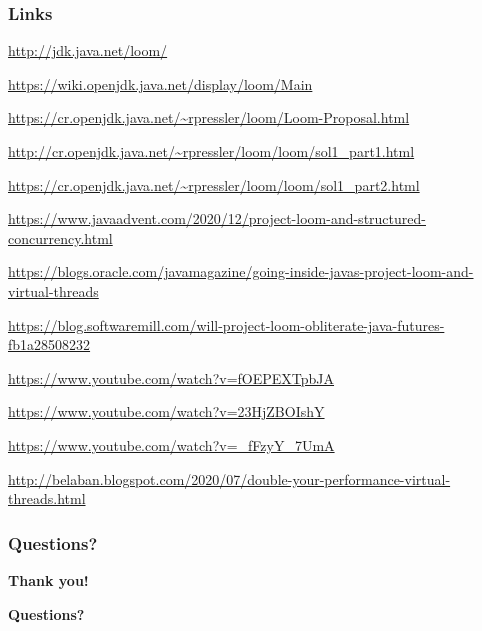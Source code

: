 \documentclass[10pt,utf8]{beamer}
\begin{document}

\begin{frame}
    \frametitle{Links}
    \begin{itemize}
    {\scriptsize
        \item \url{http://jdk.java.net/loom/}
        \item \url{https://wiki.openjdk.java.net/display/loom/Main}
        \item \url{https://cr.openjdk.java.net/~rpressler/loom/Loom-Proposal.html}
        \item \url{http://cr.openjdk.java.net/~rpressler/loom/loom/sol1_part1.html}
        \item \url{https://cr.openjdk.java.net/~rpressler/loom/loom/sol1_part2.html}
        \item \url{https://www.javaadvent.com/2020/12/project-loom-and-structured-concurrency.html}
        \item \url{https://blogs.oracle.com/javamagazine/going-inside-javas-project-loom-and-virtual-threads}
        \item \url{https://blog.softwaremill.com/will-project-loom-obliterate-java-futures-fb1a28508232}
        \item \url{https://www.youtube.com/watch?v=fOEPEXTpbJA}
        \item \url{https://www.youtube.com/watch?v=23HjZBOIshY}
        \item \url{https://www.youtube.com/watch?v=_fFzyY_7UmA}
        \item \url{http://belaban.blogspot.com/2020/07/double-your-performance-virtual-threads.html}
    }
    \end{itemize}
\end{frame}

\begin{frame}
    \frametitle{Questions?}
    \centering
     \textbf{\Huge{Thank you!}}
    
    \vspace{1.5cm}
    
    \textbf{\Huge{Questions?}}
    
    \vspace{1cm}
\end{frame}
\end{document}
